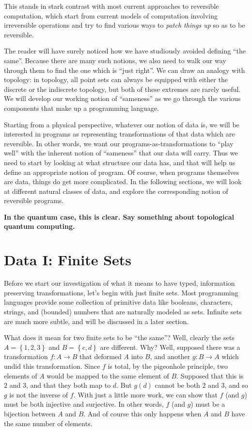 \documentclass{article}
\newcommand{\amr}[1]{\fbox{Amr says:} \textbf{#1}}
\begin{document}
This stands in stark contrast with most current approaches to
reversible computation, which start from current models of
computation involving irreversible operations and try to find
various ways to \emph{patch things up} so as to be reversible.

The reader will have surely noticed how we have studiously avoided
defining ``the same''. Because there are many such notions, we
also need to walk our way through them to find the one which is
``just right''. We can draw an analogy with topology: in topology,
all point sets can always be equipped with either the discrete or
the indiscrete topology, but both of these extremes are rarely
useful. We will develop our working notion of ``sameness''
as we go through the various components that make up a
programming language.

Starting from a physical perspective, whatever our notion of data
is, we will be interested in programs as representing transformations
of that data which are reversible. In other words, we want our
programs-as-transformations to ``play well'' with the inherent notion
of ``sameness'' that our data will carry. Thus we need to start by
looking at what structure our data has, and that will help us define
an appropriate notion of program. Of course, when programs themselves
are data, things do get more complicated.  In the following sections,
we will look at different natural classes of data, and explore the
corresponding notion of reversible programs.

\amr{In the quantum case, this is clear. Say something about topological
quantum computing.}

\section{Data I: Finite Sets}

Before we start our investigation of what it means to have typed,
information preserving transformations, let's begin with just
finite sets. Most programming languages provide some collection of primitive
data like booleans, characters, strings, and (bounded) numbers that are
naturally modeled as sets. Infinite sets are much more subtle, and will be
discussed in a later section.

What does it mean for two finite sets to be ``the same''?  Well, clearly the
sets $A = \left\{1, 2, 3\right\}$ and $B = \left\{c, d\right\}$ are different.
Why?  Well, supposed there was a transformation $f : A \rightarrow B$ that
deformed $A$ into $B$, and another $g : B \rightarrow A$ which undid this
transformation. Since $f$ is total, by the pigeonhole principle, two elements
of $A$ would be mapped to the same element of $B$. Supposed that this is $2$ and
$3$, and that they both map to $d$.  But $g(d)$ cannot be both $2$ and $3$, and
so $g$ is not the inverse of $f$. With just a little more work, we can show
that $f$ (and $g$) must be both injective and surjective. In other words,
$f$ (and $g$) must be a bijection between $A$ and $B$.  And of course this 
only happens when $A$ and $B$ have the same number of elements.
\end{document}

